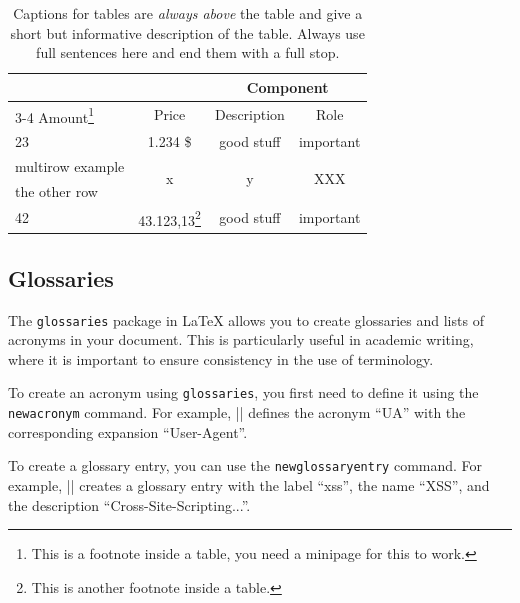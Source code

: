 \begin{table}[htbp]
	\centering
	\begin{minipage}{\textwidth} %
	\renewcommand{\footnoterule}{}
 	\renewcommand{\thefootnote}{\alph{footnote}}
	\centering
	\caption[This is the short caption for the \textit{List of Tables}.]{Captions for tables are \emph{always above} the table and give a short but informative description of the table. Always use full sentences here and end them with a full stop.}
	\label{tab1}
	\begin{tabular}{@{}lccc@{}} \toprule
	& & \multicolumn{2}{c}{Component}\\
	\cmidrule{3-4}
	Amount\footnote{This is a footnote inside a table, you need a minipage for this to work.} & Price & Description & Role \\
	\midrule
	23 & 1.234 \$ & good stuff & important\\
	\midrule
	multirow example & \multirow{2}{*}{x} & \multirow{2}{*}{y} & \multirow{2}{*}{XXX} \\
	the other row & & &\\
	\midrule
	42 & 43.123,13\footnote{This is another footnote inside a table.} & good stuff & important\\
	\bottomrule
	\end{tabular}
	\end{minipage}
\end{table}

\subsection{Glossaries}

The \texttt{glossaries} package in LaTeX allows you to create glossaries and lists of acronyms in your document. This is particularly useful in academic writing, where it is important to ensure consistency in the use of terminology.

To create an acronym using \texttt{glossaries}, you first need to define it using the \texttt{newacronym} command. For example, \code|| defines the acronym \enquote{UA} with the corresponding expansion \enquote{User-Agent}.

To create a glossary entry, you can use the \texttt{newglossaryentry} command. For example, \code|| creates a glossary entry with the label \enquote{xss}, the name \enquote{XSS}, and the description \enquote{Cross-Site-Scripting...}.

